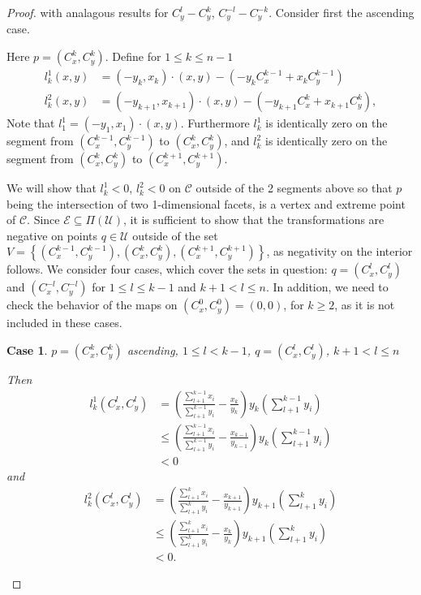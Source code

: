 \documentclass{article}
\theoremstyle{case}
\newtheorem{case}{Case}
\begin{document}
\begin{proof}
with analagous results for $C_y^l - C_y^k$, $C_y^{-l} - C_y^{-k}$.
Consider first the ascending case.


Here $p = \left( C_x^k, C_y^k \right)$.  Define for $1 \leq k \leq n-1$
\begin{align*}
l_k^1\left( x,y\right) &= \left( -y_k, x_k\right) \cdot \left( x,y\right) - \left( -y_kC_x^{k-1} + x_kC_y^{k-1}\right) \\
l_k^2\left( x,y\right) &= \left( -y_{k+1}, x_{k+1}\right) \cdot \left( x,y\right) - \left( -y_{k+1}C_x^k + x_{k+1}C_y^k\right),
\end{align*}
Note that $l_1^1 = \left( -y_1, x_1\right) \cdot \left( x,y\right)$. Furthermore $l_k^1$ is identically zero on the segment from $\left( C_x^{k-1}, C_y^{k-1}\right)$ to $\left( C_x^k, C_y^k\right)$, and $l_k^2$ is identically zero on the segment from $\left( C_x^k, C_y^k\right)$ to $\left( C_x^{k+1}, C_y^{k+1}\right)$. 

We will show that $l_k^1 < 0$, $l_k^2 < 0$ on $\mathcal{C}$ outside of the 2 segments above so that $p$ being the intersection of two 1-dimensional facets, is a vertex and extreme point of $\mathcal{C}$. Since $\mathcal{E} \subseteq \Pi\left( \mathcal{U}\right)$, it is sufficient to show that the transformations are negative on points $q \in \mathcal{U}$ outside of the set  $V = \left\lbrace \left( C_x^{k-1}, C_y^{k-1}\right), \left( C_x^k, C_y^k\right), \left( C_x^{k+1}, C_y^{k+1}\right)\right\rbrace$, as negativity on the interior follows. We consider four cases, which cover the sets in question: $q = (C_x^l, C_y^l)$ and $(C_x^{-l}, C_y^{-l})$ for $1 \leq l \leq k-1$ and $k+1 < l \leq n$. In addition, we need to check the behavior of the maps on $(C_x^0, C_y^0) = (0,0)$, for $k \geq 2$, as it is not included in these cases. 

%
%
\begin{case} $p = \left( C_x^k, C_y^k \right)$ ascending, $1 \leq l < k-1$, $q = \left( C_x^l, C_y^l\right)$, $k+1 < l \leq n$

\noindent Then
\begin{align*}
l_k^1\left( C_x^l, C_y^l\right) &= \left( \frac{\sum_{l+1}^{k-1} x_i}{\sum_{l+1}^{k-1} y_i} - \frac{x_k}{y_k}\right)y_k\left( \sum_{l+1}^{k-1} y_i\right) \\
&\leq \left( \frac{\sum_{l+1}^{k-1} x_i}{\sum_{l+1}^{k-1} y_i} - \frac{x_{k-1}}{y_{k-1}}\right)y_k\left( \sum_{l+1}^{k-1} y_i\right) \\
&< 0
\end{align*}
and 
\begin{align*}
l_k^2\left(C_x^l, C_y^l\right) &= \left( \frac{\sum_{l+1}^k x_i}{\sum_{l+1}^k y_i} - \frac{x_{k+1}}{y_{k+1}}\right) y_{k+1}\left(\sum_{l+1}^{k}y_i\right) \\
&\leq \left( \frac{\sum_{l+1}^k x_i}{\sum_{l+1}^k y_i} - \frac{x_k}{y_k}\right) y_{k+1}\left(\sum_{l+1}^{k}y_i\right)\\
&< 0.
\end{align*}
\end{case} 


\end{proof}
\end{document}
